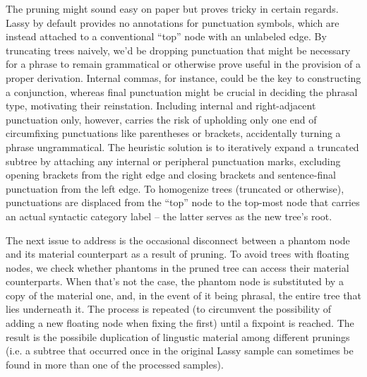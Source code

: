 The pruning might sound easy on paper but proves tricky in certain regards.
Lassy by default provides no annotations for punctuation symbols, which are instead attached to a conventional ``top'' node with an unlabeled edge.
By truncating trees naively, we'd be dropping punctuation that might be necessary for a phrase to remain grammatical or otherwise prove useful in the provision of a proper derivation.
Internal commas, for instance, could be the key to constructing a conjunction, whereas final punctuation might be crucial in deciding the phrasal type, motivating their reinstation.
Including internal and right-adjacent punctuation only, however, carries the risk of upholding only one end of circumfixing punctuations like parentheses or brackets, accidentally turning a phrase ungrammatical.
The heuristic solution is to iteratively expand a truncated subtree by attaching any internal or peripheral punctuation marks, excluding opening brackets from the right edge and closing brackets and sentence-final punctuation from the left edge.
To homogenize trees (truncated or otherwise), punctuations are displaced from the ``top'' node to the top-most node that carries an actual syntactic category label -- the latter serves as the new tree's root.

The next issue to address is the occasional disconnect between a phantom node and its material counterpart as a result of pruning.
To avoid trees with floating nodes, we check whether phantoms in the pruned tree can access their material counterparts.
When that's not the case, the phantom node is substituted by a copy of the material one, and, in the event of it being phrasal, the entire tree that lies underneath it.
The process is repeated (to circumvent the possibility of adding a new floating node when fixing the first) until a fixpoint is reached.
The result is the possibile duplication of lingustic material among different prunings (i.e. a subtree that occurred once in the original Lassy sample can sometimes be found in more than one of the processed samples).

